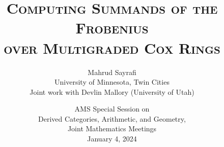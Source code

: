 \documentclass[beamer]{paper}
\newcommand{\lc}{\MakeLowercase}
\begin{document}
\rmfamily
{}

\title[Computing summands of the Frobenius over Cox rings]
      {\textsc{Computing Summands of the Frobenius \\ over Multigraded Cox Rings}}



\author[Mahrud Sayrafi]{M\lc{ahrud} S\lc{ayrafi} \\
  {\footnotesize U\lc{niversity} of M\lc{innesota}, T\lc{win} C\lc{ities}} \\[0em]
  {\footnotesize Joint work with Devlin Mallory (University of Utah)}}


\date{{\footnotesize AMS Special Session on \\
    Derived Categories, Arithmetic, and Geometry, \\
    Joint Mathematics Meetings} \\ January 4, 2024}

\frame[plain]{\titlepage}
\end{document}
